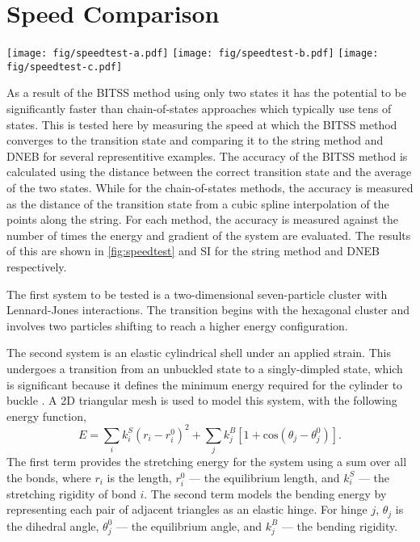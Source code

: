 \documentclass[aps,twocolumn]{revtex4}
\newcommand{\temp}[1]{{\leavevmode\color{red}#1}}
\begin{document}
\section{Speed Comparison}
\begin{figure*}[htb]
  \centering
  \texttt{[image: fig/speedtest-a.pdf]}%
  \texttt{[image: fig/speedtest-b.pdf]}%
  \texttt{[image: fig/speedtest-c.pdf]}%
  \caption{
    The rate of convergence to the transition state for (a) a Lennard-Jones seven-particle cluster, (b) cylindrical shell buckling, (c) wetting of a chemically-striped surface.
    Above are the two minimum energy states and the transition state between them.
    Below is shown the convergence to the transition state as a function of the number of gradient calculations using the BITSS (black line) and string methods.
    The string method is repeated with a differing number of images along the string, the number of which is listed in the legend in (c).
  }
  \label{fig:speedtest}
\end{figure*}

\topic As a result of the BITSS method using only two states it has the potential to be significantly faster than chain-of-states approaches which typically use tens of states.
This is tested here by measuring the speed at which the BITSS method converges to the transition state and comparing it to the string method and DNEB for several representitive examples.
The accuracy of the BITSS method is calculated using the distance between the correct transition state and the average of the two states.
While for the chain-of-states methods, the accuracy is measured as the distance of the transition state from a cubic spline interpolation of the points along the string.
For each method, the accuracy is measured against the number of times the energy and gradient of the system are evaluated.
The results of this are shown in \cref{fig:speedtest} and \temp{SI} for the string method and DNEB respectively.

\topic The first system to be tested is a two-dimensional seven-particle cluster with Lennard-Jones interactions.
The transition begins with the hexagonal cluster and involves two particles shifting to reach a higher energy configuration.

\topic The second system is an elastic cylindrical shell under an applied strain.
This undergoes a transition from an unbuckled state to a singly-dimpled state, which is significant because it defines the minimum energy required for the cylinder to buckle \cite{Panter2019}.
A 2D triangular mesh is used to model this system, with the following energy function,
\begin{equation}
  E = \sum_i k^S_i (r_i - r^0_i)^2 + \sum_j k^B_j [1 + \text{cos}(\theta_j - \theta^0_j)].
\end{equation}
The first term provides the stretching energy for the system using a sum over all the bonds, where $r_i$ is the length, $r^0_i$ --- the equilibrium length, and $k^S_i$ --- the stretching rigidity of bond $i$.
The second term models the bending energy by representing each pair of adjacent triangles as an elastic hinge.
For hinge $j$, $\theta_j$ is the dihedral angle, $\theta^0_j$ --- the equilibrium angle, and $k^B_j$ --- the bending rigidity.
\end{document}
